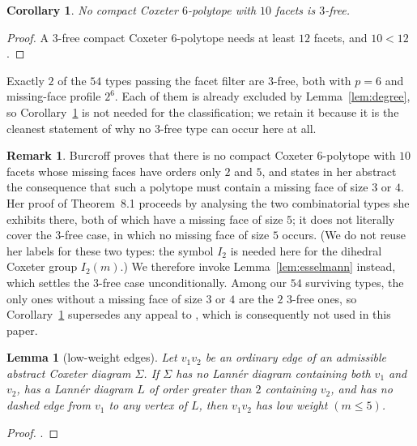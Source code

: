 \documentclass[11pt,reqno]{amsart}
\theoremstyle{plain}
\newtheorem{lemma}[theorem]{Lemma}
\newtheorem{corollary}[theorem]{Corollary}
\theoremstyle{definition}
\newtheorem{remark}[theorem]{Remark}
\newcommand{\NumSurvivors}{54}
\newcommand{\NumThreeFree}{2}
\newcommand{\ThreeFreeProfile}{2^{6}}
\begin{document}
\begin{corollary}
\label{cor:threefree}
No compact Coxeter $6$-polytope with $10$ facets is $3$-free.
\end{corollary}
\begin{proof}
A $3$-free compact Coxeter $6$-polytope needs at least $12$ facets, and $10<12$.
\end{proof}

Exactly $\NumThreeFree$ of the $\NumSurvivors$ types passing the facet filter are
$3$-free, both with $p=6$ and missing-face profile $\ThreeFreeProfile$. Each of
them is already excluded by Lemma~\ref{lem:degree}, so Corollary~\ref{cor:threefree}
is not needed for the classification; we retain it because it is the cleanest
statement of why no $3$-free type can occur here at all.

\begin{remark}
Burcroff proves \cite[Thm.~8.1]{Burcroff2024} that there is no compact Coxeter
$6$-polytope with $10$ facets whose missing faces have orders only $2$ and $5$,
and states in her abstract the consequence that such a polytope must contain a
missing face of size $3$ or $4$. Her proof of Theorem~8.1 proceeds by analysing
the two combinatorial types she exhibits there, both of which have a missing
face of size $5$; it does not literally cover the $3$-free case, in which no
missing face of size $5$ occurs. (We do not reuse her labels for these two types:
the symbol $I_2$ is needed here for the dihedral Coxeter group $I_2(m)$.) We therefore invoke Lemma~\ref{lem:esselmann}
instead, which settles the $3$-free case unconditionally. Among our
$\NumSurvivors$ surviving types, the only ones without a missing face of size
$3$ or $4$ are the $\NumThreeFree$ $3$-free ones, so
Corollary~\ref{cor:threefree} supersedes any appeal to
\cite[Thm.~8.1]{Burcroff2024}, which is consequently not used in this paper.
\end{remark}

\begin{lemma}[low-weight edges]
\label{lem:burcroff55b}
Let $v_1v_2$ be an ordinary edge of an admissible abstract Coxeter diagram
$\Sigma$. If $\Sigma$ has no Lann\'er diagram containing both $v_1$ and $v_2$,
has a Lann\'er diagram $L$ of order greater than $2$ containing $v_2$, and has
no dashed edge from $v_1$ to any vertex of $L$, then $v_1v_2$ has low weight
$(m\le5)$.
\end{lemma}
\begin{proof}
\cite[Lemma~5.5(b)]{Burcroff2024}.
\end{proof}
\end{document}
